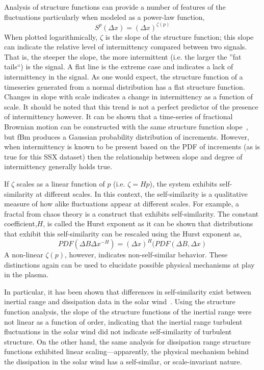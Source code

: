 \documentclass[aps,prl,amsmath,amssymb,reprint,superscriptaddress]{revtex4-1} %
\begin{document}
Analysis of structure functions can provide a number of features of the fluctuations particularly when modeled as a power-law function,
\begin{equation}
S^{p}(\Delta x) = (\Delta x)^{\zeta(p)}
\label{eq:power-law}
\end{equation}
When plotted logarithmically, $\zeta$ is the slope of the structure function; this slope can indicate the relative level of intermittency compared between two signals. That is, the steeper the slope, the more intermittent (i.e. the larger the ''fat tails``) is the signal. A flat line is the extreme case and indicates a lack of intermittency in the signal. As one would expect, the structure function of a timeseries generated from a normal distribution has a flat structure function. Changes in slope with scale indicates a change in intermittency as a function of scale. It should be noted that this trend is not a perfect predictor of the presence of intermittency however. It can be shown that a time-series of fractional Brownian motion can be constructed with the same structure function slope~\cite{hnat2003}, but fBm produces a Gaussian probability distribution of increments. However, when intermittency is known to be present based on the PDF of increments (as is true for this SSX dataset) then the relationship between slope and degree of intermittency generally holds true.

If $\zeta$ scales as a linear function of $p$ (i.e. $\zeta = Hp$), the system exhibits self-similarity at different scales. In this context, the self-similarity is a qualitative measure of how alike fluctuations appear at different scales. For example, a fractal from chaos theory is a construct that exhibits self-similarity. The constant coefficient,$H$, is called the Hurst exponent as it can be shown that distributions that exhibit this self-similarity can be rescaled using the Hurst exponent as,
\begin{equation}
PDF(\Delta B\Delta x^{-H}) = (\Delta x)^H(PDF(\Delta B,\Delta x)
\label{eq:scaling}
\end{equation}
A non-linear $\zeta(p)$, however, indicates non-self-similar behavior. These distinctions again can be used to elucidate possible physical mechanisms at play in the plasma. 

In particular, it has been shown that differences in self-similarity exist between inertial range and dissipation data in the solar wind~\cite{kiyani2009,kiyani2013}. Using the structure function analysis, the slope of the structure functions of the inertial range were not linear as a function of order, indicating that the inertial range turbulent fluctuations in the solar wind did not indicate self-similarity of turbulent structure. On the other hand, the same analysis for dissipation range structure functions exhibited linear scaling---apparently, the physical mechanism behind the dissipation in the solar wind has a self-similar, or scale-invariant nature.
\end{document}
